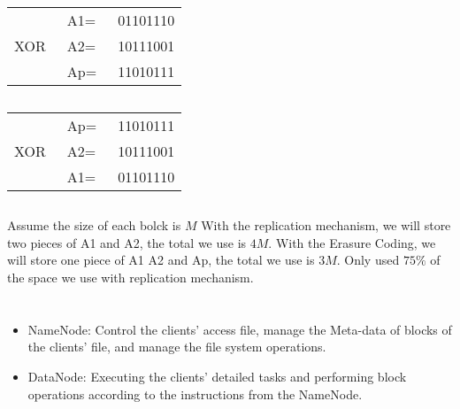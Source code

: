 \documentclass{article}
\begin{document}
        \subsection{}

                \begin{tabular}{llr}
                    &A1=&\  01101110\\
                    XOR\ &A2= &\  10111001\\
                    \hline
                    &Ap= &\  11010111
                \end{tabular}
        \subsection{}

                \begin{tabular}{llr}
                    &Ap=&\  11010111\\
                    XOR\ &A2=&\  10111001\\
                    \hline
                    &A1= &\  01101110
                \end{tabular}
        \subsection{}
            \paragraph{}
            Assume the size of each bolck is $M$
            With the replication mechanism, we will store two pieces of A1 and A2, the total we use is $4M$. With the Erasure Coding, we will store one piece of A1 A2 and Ap, the total we use is $3M$. Only used $75\%$ of the space we use with replication mechanism.
    \section{}
        \subsection{}
            \paragraph{}
            \begin{itemize}
                \item NameNode: Control the clients' access file, manage the Meta-data of blocks of the clients' file, and manage the file system operations.
                \item DataNode: Executing the clients' detailed tasks and performing block operations according to the instructions from the NameNode.
            \end{itemize}
\end{document}

